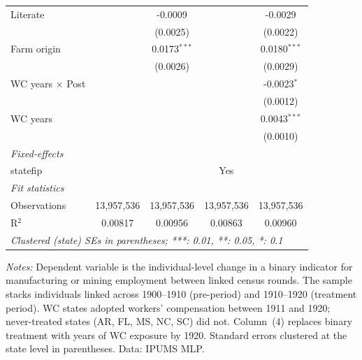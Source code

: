 \begin{table}[htbp]
{\begin{tabular}{lcccc}
      Literate                &                 & -0.0009         &                 & -0.0029\\   
                              &                 & (0.0025)        &                 & (0.0022)\\   
      Farm origin             &                 & 0.0173$^{***}$  &                 & 0.0180$^{***}$\\   
                              &                 & (0.0026)        &                 & (0.0029)\\   
      WC years $\times$ Post  &                 &                 &                 & -0.0023$^{*}$\\   
                              &                 &                 &                 & (0.0012)\\   
      WC years                &                 &                 &                 & 0.0043$^{***}$\\   
                              &                 &                 &                 & (0.0010)\\   
      \midrule
      \emph{Fixed-effects}\\
      statefip                &                 &                 & Yes             & \\  
      \midrule
      \emph{Fit statistics}\\
      Observations            & 13,957,536      & 13,957,536      & 13,957,536      & 13,957,536\\  
      R$^2$                   & 0.00817         & 0.00956         & 0.00863         & 0.00960\\  
      \midrule \midrule
      \multicolumn{5}{l}{\emph{Clustered (state) SEs in parentheses; ***: 0.01, **: 0.05, *: 0.1}}\\
   \end{tabular}%
   }

   \par \raggedright \footnotesize
   \textit{Notes:} Dependent variable is the individual-level change in a binary indicator for manufacturing or mining employment between linked census rounds. The sample stacks individuals linked across 1900--1910 (pre-period) and 1910--1920 (treatment period). WC states adopted workers' compensation between 1911 and 1920; never-treated states (AR, FL, MS, NC, SC) did not. Column~(4) replaces binary treatment with years of WC exposure by 1920. Standard errors clustered at the state level in parentheses. Data: IPUMS MLP.
\end{table}


